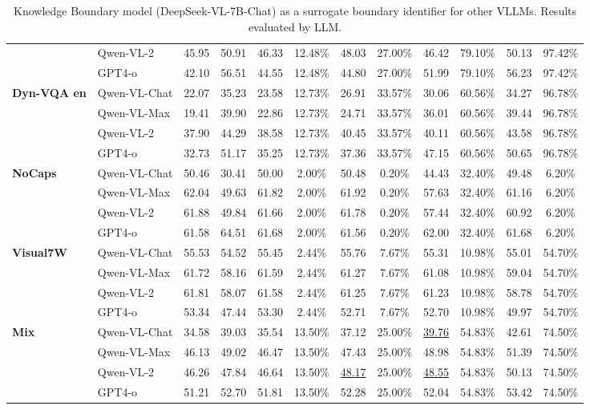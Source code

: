 \begin{table*}[t]
{\begin{tabular}{llcccccccc|cc}
 & Qwen-VL-2 & 45.95 & 50.91 & 46.33 & 12.48\% & 48.03 & 27.00\% & 46.42 & 79.10\% & 50.13 & 97.42\% \\
 & GPT4-o & 42.10 & 56.51 & 44.55 & 12.48\% & 44.80 & 27.00\% & 51.99 & 79.10\% & 56.23 & 97.42\% \\ 
\midrule
\multirow{4}{*}{\textbf{Dyn-VQA en}} & Qwen-VL-Chat & 22.07 & 35.23 & 23.58 & 12.73\% & 26.91 & 33.57\% & 30.06 & 60.56\% & 34.27 & 96.78\% \\
 & Qwen-VL-Max & 19.41 & 39.90 & 22.86 & 12.73\% & 24.71 & 33.57\% & 36.01 & 60.56\% & 39.44 & 96.78\% \\
 & Qwen-VL-2 & 37.90 & 44.29 & 38.58 & 12.73\% & 40.45 & 33.57\% & 40.11 & 60.56\% & 43.58 & 96.78\% \\
 & GPT4-o & 32.73 & 51.17 & 35.25 & 12.73\% & 37.36 & 33.57\% & 47.15 & 60.56\% & 50.65 & 96.78\% \\ 
\midrule
\multirow{4}{*}{\textbf{NoCaps}} & Qwen-VL-Chat & 50.46 & 30.41 & 50.00 & 2.00\% & 50.48 & 0.20\% & 44.43 & 32.40\% & 49.48 & 6.20\% \\
 & Qwen-VL-Max & 62.04 & 49.63 & 61.82 & 2.00\% & 61.92 & 0.20\% & 57.63 & 32.40\% & 61.16 & 6.20\% \\
 & Qwen-VL-2 & 61.88 & 49.84 & 61.66 & 2.00\% & 61.78 & 0.20\% & 57.44 & 32.40\% & 60.92 & 6.20\% \\
 & GPT4-o & 61.58 & 64.51 & 61.68 & 2.00\% & 61.56 & 0.20\% & 62.00 & 32.40\% & 61.68 & 6.20\% \\ 
\midrule
\multirow{4}{*}{\textbf{Visual7W}} & Qwen-VL-Chat & 55.53 & 54.52 & 55.45 & 2.44\% & 55.76 & 7.67\% & 55.31 & 10.98\% & 55.01 & 54.70\% \\
 & Qwen-VL-Max & 61.72 & 58.16 & 61.59 & 2.44\% & 61.27 & 7.67\% & 61.08 & 10.98\% & 59.04 & 54.70\% \\
 & Qwen-VL-2 & 61.81 & 58.07 & 61.58 & 2.44\% & 61.25 & 7.67\% & 61.23 & 10.98\% & 58.78 & 54.70\% \\
 & GPT4-o & 53.34 & 47.44 & 53.30 & 2.44\% & 52.71 & 7.67\% & 52.70 & 10.98\% & 49.97 & 54.70\% \\ 
\midrule
\midrule
\multirow{4}{*}{\textbf{Mix}} & Qwen-VL-Chat & 34.58 & 39.03 & 35.54 & 13.50\% & 37.12 & 25.00\% & \uline{39.76} & 54.83\% & 42.61 & 74.50\% \\
 & Qwen-VL-Max & 46.13 & 49.02 & 46.47 & 13.50\% & 47.43 & 25.00\% & 48.98 & 54.83\% & 51.39 & 74.50\% \\
 & Qwen-VL-2 & 46.26 & 47.84 & 46.64 & 13.50\% & \uline{48.17} & 25.00\% & \uline{48.55} & 54.83\% & 50.13 & 74.50\% \\
 & GPT4-o & 51.21 & 52.70 & 51.81 & 13.50\% & 52.28 & 25.00\% & 52.04 & 54.83\% & 53.42 & 74.50\% \\
\bottomrule
\end{tabular}
}
\caption{Knowledge Boundary model (DeepSeek-VL-7B-Chat) as a surrogate boundary identifier for other VLLMs. Results evaluated by LLM.}
\label{main_results_ds_llm_table}
\end{table*}

